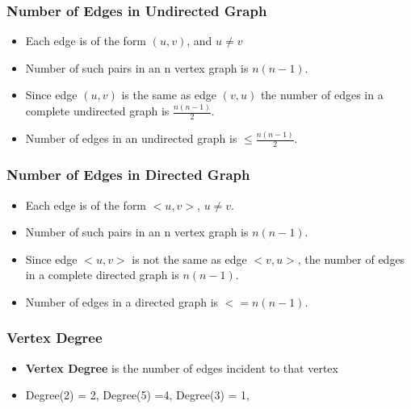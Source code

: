 \documentclass[newPxFont,sthlmFooter,nooffset]{beamer}
\begin{document}
\begin{frame}[t]
  \frametitle{Number of Edges in Undirected Graph}
  \begin{itemize}
  \item Each edge is of the form $(u, v)$, and $u \neq v$
  \item Number of such pairs in an n vertex graph is $n(n-1)$.
  \item Since edge $(u,v)$ is the same as edge $(v,u)$ the number of edges in a complete undirected graph is $\frac{n(n-1)}{2}$.
  \item Number of edges in an undirected graph is $\leq \frac{n(n-1)}{2}$.
  \end{itemize}
\end{frame}


\begin{frame}[t]
  \frametitle{Number of Edges in Directed Graph}
  \begin{itemize}
  \item Each edge is of the form $<u,v>$, $u \neq v$.
  \item Number of such pairs in an n vertex graph is $n(n-1)$.
  \item Since edge $<u,v>$ is not the same as edge $<v,u>$, the
number of edges in a complete directed graph is $n(n-1)$.
\item Number of edges in a directed graph is $<= n(n-1)$.
  \end{itemize}
\end{frame}


\begin{frame}[t]
  \frametitle{Vertex Degree}
  \begin{itemize}
  \item \textbf{Vertex Degree} is the number of edges incident to that vertex
  \item Degree(2) = 2, Degree(5) =4, Degree(3) = 1, 
  \end{itemize}
  \begin{center}
  \end{center}

\end{frame}
\end{document}
